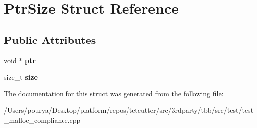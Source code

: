 \hypertarget{structPtrSize}{}\section{Ptr\+Size Struct Reference}
\label{structPtrSize}
\subsection*{Public Attributes}
\begin{DoxyCompactItemize}
\item 
\hypertarget{structPtrSize_a9e26b859d94dbfabeb79d086f2dbe299}{}void $\ast$ {\bfseries ptr}\label{structPtrSize_a9e26b859d94dbfabeb79d086f2dbe299}

\item 
\hypertarget{structPtrSize_a42506566c32bebabb7a490502ca2b97b}{}size\+\_\+t {\bfseries size}\label{structPtrSize_a42506566c32bebabb7a490502ca2b97b}

\end{DoxyCompactItemize}


The documentation for this struct was generated from the following file\+:\begin{DoxyCompactItemize}
\item 
/\+Users/pourya/\+Desktop/platform/repos/tetcutter/src/3rdparty/tbb/src/test/test\+\_\+malloc\+\_\+compliance.\+cpp\end{DoxyCompactItemize}
